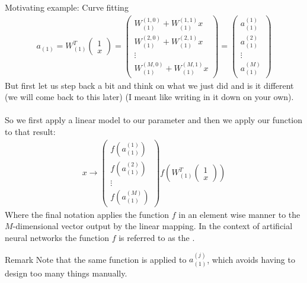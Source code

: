 \begin{parag}{Motivating example: Curve fitting}
\begin{align*}
		a_{\left(1\right)} =  W_{\left(1\right)}^{T} \begin{pmatrix} 1 \\ x \end{pmatrix}  = \begin{pmatrix} W_{\left(1\right)}^{\left(1, 0\right)} + W_{\left(1\right)}^{\left(1, 1\right)}x \\ W_{\left(1\right)}^{\left(2, 0\right)}  + W_{\left(1\right)}^{\left(2, 1\right)}x\\ \vdots \\ W_{\left(1\right)}^{\left(M, 0\right)} + W_{\left(1\right)}^{\left(M, 1\right)}x \end{pmatrix} = \begin{pmatrix} a_{\left(1\right)}^{\left(1\right)} \\ a_{\left(1\right)}^{\left(2\right)} \\ \vdots \\ a_{\left(1\right)}^{\left(M\right)} \end{pmatrix} 
	\end{align*}
	But first let us step back a bit and think on what we just did and  is it different (we will come back to this later) (I meant like writing in it down on your own).\\
	$ $\\
	So we first apply a linear model to our parameter and then we apply our function to that result:
	\begin{align*} 
		x \to \begin{pmatrix} f\left(a_{\left(1\right)}^{\left(1\right)}\right) \\ f\left(a_{\left(1\right)}^{\left(2\right)}\right)\\ \vdots \\ f\left(a_{\left(1\right)}^{\left(M\right)}\right) \end{pmatrix} f\left(W_{\left(1\right)}^{T}\begin{pmatrix} 1 \\ x \end{pmatrix} \right)
	\end{align*}
	Where the final notation applies the function $f$ in an element wise manner to the $M$-dimensional vector output by the linear mapping. In the context of artificial neural networks the function $f$ is referred to as the .
	\begin{subparag}{Remark}
	    Note that the same function is applied to  $a_{\left(1\right)}^{\left(j\right)}$, which avoids having to design too many things manually.
	\end{subparag}
\end{parag}


